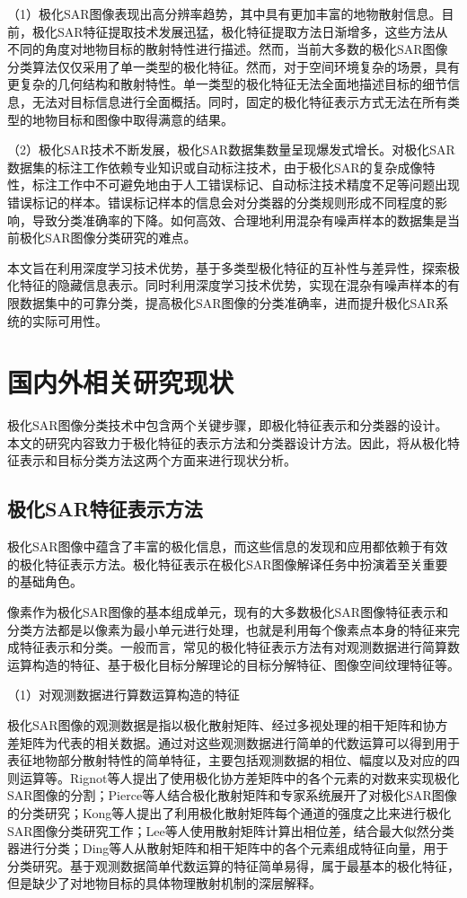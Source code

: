 （1）极化SAR图像表现出高分辨率趋势，其中具有更加丰富的地物散射信息。目前，极化SAR特征提取技术发展迅猛，极化特征提取方法日渐增多，这些方法从不同的角度对地物目标的散射特性进行描述。然而，当前大多数的极化SAR图像分类算法仅仅采用了单一类型的极化特征。然而，对于空间环境复杂的场景，具有更复杂的几何结构和散射特性。单一类型的极化特征无法全面地描述目标的细节信息，无法对目标信息进行全面概括。同时，固定的极化特征表示方式无法在所有类型的地物目标和图像中取得满意的结果。

（2）极化SAR技术不断发展，极化SAR数据集数量呈现爆发式增长。对极化SAR数据集的标注工作依赖专业知识或自动标注技术，由于极化SAR的复杂成像特性，标注工作中不可避免地由于人工错误标记、自动标注技术精度不足等问题出现错误标记的样本。错误标记样本的信息会对分类器的分类规则形成不同程度的影响，导致分类准确率的下降。如何高效、合理地利用混杂有噪声样本的数据集是当前极化SAR图像分类研究的难点。

本文旨在利用深度学习技术优势，基于多类型极化特征的互补性与差异性，探索极化特征的隐藏信息表示。同时利用深度学习技术优势，实现在混杂有噪声样本的有限数据集中的可靠分类，提高极化SAR图像的分类准确率，进而提升极化SAR系统的实际可用性。

\section{国内外相关研究现状}
极化SAR图像分类技术中包含两个关键步骤，即极化特征表示和分类器的设计。本文的研究内容致力于极化特征的表示方法和分类器设计方法。因此，将从极化特征表示和目标分类方法这两个方面来进行现状分析。

\subsection{极化SAR特征表示方法}
极化SAR图像中蕴含了丰富的极化信息，而这些信息的发现和应用都依赖于有效的极化特征表示方法。极化特征表示在极化SAR图像解译任务中扮演着至关重要的基础角色。

像素作为极化SAR图像的基本组成单元，现有的大多数极化SAR图像特征表示和分类方法都是以像素为最小单元进行处理，也就是利用每个像素点本身的特征来完成特征表示和分类。一般而言，常见的极化特征表示方法有对观测数据进行简算数运算构造的特征、基于极化目标分解理论的目标分解特征、图像空间纹理特征等。

（1）对观测数据进行算数运算构造的特征

极化SAR图像的观测数据是指以极化散射矩阵、经过多视处理的相干矩阵和协方差矩阵为代表的相关数据。通过对这些观测数据进行简单的代数运算可以得到用于表征地物部分散射特性的简单特征，主要包括观测数据的相位、幅度以及对应的四则运算等。Rignot等人提出了使用极化协方差矩阵中的各个元素的对数来实现极化SAR图像的分割；Pierce等人结合极化散射矩阵和专家系统展开了对极化SAR图像的分类研究；Kong等人提出了利用极化散射矩阵每个通道的强度之比来进行极化SAR图像分类研究工作；Lee等人使用散射矩阵计算出相位差，结合最大似然分类器进行分类；Ding等人从散射矩阵和相干矩阵中的各个元素组成特征向量，用于分类研究。基于观测数据简单代数运算的特征简单易得，属于最基本的极化特征，但是缺少了对地物目标的具体物理散射机制的深层解释。

